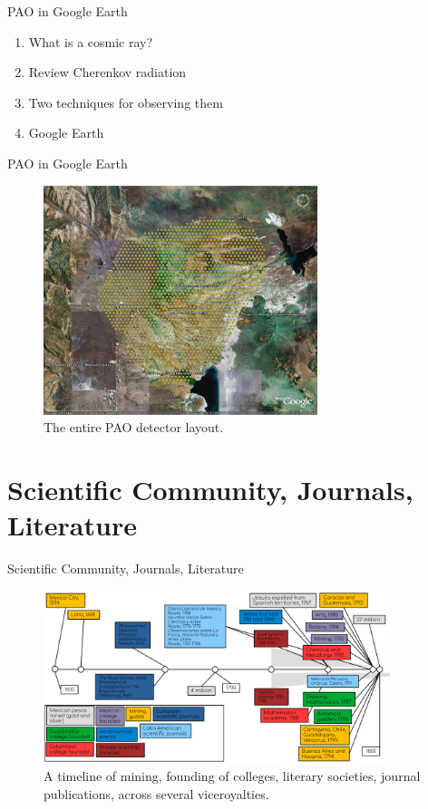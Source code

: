 \documentclass{beamer}
\begin{document}
\begin{frame}{PAO in Google Earth}
\begin{enumerate}
\item What is a cosmic ray?
\item Review Cherenkov radiation
\item Two techniques for observing them
\item Google Earth
\end{enumerate}
\end{frame}

\begin{frame}{PAO in Google Earth}
\begin{figure}
\centering
\includegraphics[width=8cm]{figures/Auger.jpg}
\caption{\label{fig:aug} The entire PAO detector layout.}
\end{figure}
\end{frame}

\section{Scientific Community, Journals, Literature}

\begin{frame}{Scientific Community, Journals, Literature}
\begin{figure}
\centering
\includegraphics[width=0.9\textwidth]{figures/Timeline2.pdf}
\caption{\label{fig:timeline2} A timeline of mining, founding of colleges, literary societies, journal publications, across several viceroyalties.}
\end{figure}
\end{frame}
\end{document}
